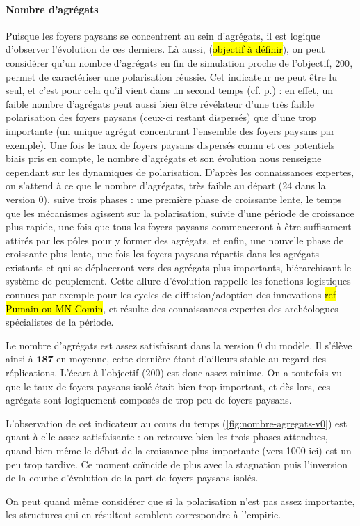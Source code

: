 \paragraph{Nombre d'agrégats}

Puisque les foyers paysans se concentrent au sein d'agrégats, il est logique d'observer l'évolution de ces derniers. Là aussi, (\hl{objectif à définir}), on peut considérer qu'un nombre d'agrégats en fin de simulation proche de l'objectif, $200$, permet de caractériser une polarisation réussie. Cet indicateur ne peut être lu seul, et c'est pour cela qu'il vient dans un second temps (cf. p.\pageref{par:hierarchie_interne}) : en effet, un faible nombre d'agrégats peut aussi bien être révélateur d'une très faible polarisation des foyers paysans (ceux-ci restant dispersés) que d'une trop importante (un unique agrégat concentrant l'ensemble des foyers paysans par exemple).
Une fois le taux de foyers paysans dispersés connu et ces potentiels biais pris en compte, le nombre d'agrégats et son évolution nous renseigne cependant sur les dynamiques de polarisation. 
D'après les connaissances expertes, on s'attend à ce que le nombre d'agrégats, très faible au départ (24 dans la version 0), suive trois phases : une première phase de croissante lente, le temps que les mécanismes agissent sur la polarisation, suivie d'une période de croissance plus rapide, une fois que tous les foyers paysans commenceront à être suffisament attirés par les pôles pour y former des agrégats, et enfin, une nouvelle phase de croissante plus lente, une fois les foyers paysans répartis dans les agrégats existants et qui se déplaceront vers des agrégats plus importants, hiérarchisant le système de peuplement. Cette allure d'évolution rappelle les fonctions logistiques connues par exemple pour les cycles de diffusion/adoption des innovations \hl{ref Pumain ou MN Comin}, et résulte des connaissances expertes des archéologues spécialistes de la période.

\begin{mdframed}[backgroundcolor=gray!10,footnoteinside=false]
	Le nombre d'agrégats est assez satisfaisant dans la version 0 du modèle. Il s'élève ainsi à $\textbf{187}$ en moyenne, cette dernière étant d'ailleurs stable au regard des réplications. L'écart à l'objectif ($200$) est donc assez minime. On a toutefois vu que le taux de foyers paysans isolé était bien trop important, et dès lors, ces agrégats sont logiquement composés de trop peu de foyers paysans.
	
	L'observation de cet indicateur au cours du temps (\cref{fig:nombre-agregats-v0}) est quant à elle assez satisfaisante : on retrouve bien les trois phases attendues, quand bien même le début de la croissance plus importante (vers 1000 ici) est un peu trop tardive. Ce moment coïncide de plus avec la stagnation puis l'inversion de la courbe d'évolution de la part de foyers paysans isolés.
	
	On peut quand même considérer que si la polarisation n'est pas assez importante, les structures qui en résultent semblent correspondre à l'empirie.
\end{mdframed}

